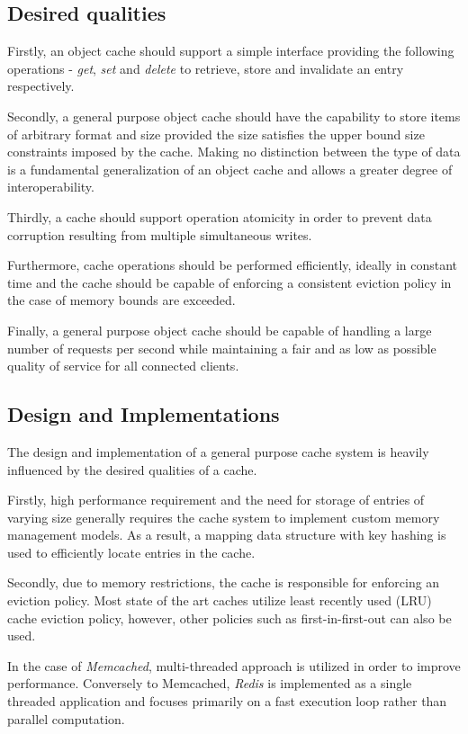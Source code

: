 \subsection{Desired qualities}
Firstly, an object cache should support a simple interface providing the following operations - \textit{get}, \textit{set} and \textit{delete} to retrieve, store and invalidate an entry respectively.

Secondly, a general purpose object cache should have the capability to store items of arbitrary format and size provided the size satisfies the upper bound size constraints imposed by the cache. Making no distinction between the type of data is a fundamental generalization of an object cache and allows a greater degree of interoperability.

Thirdly, a cache should support operation atomicity in order to prevent data corruption resulting from multiple simultaneous writes.

Furthermore, cache operations should be performed efficiently, ideally in constant time and the cache should be capable of enforcing a consistent eviction policy in the case of memory bounds are exceeded.

Finally, a general purpose object cache should be capable of handling a large number of requests per second while maintaining a fair and as low as possible quality of service for all connected clients.


\subsection{Design and Implementations}
The design and implementation of a general purpose cache system is heavily influenced by the desired qualities of a cache.

Firstly, high performance requirement and the need for storage of entries of varying size generally requires the cache system to implement custom memory management models. As a result, a mapping data structure  with key hashing is used to efficiently locate entries in the cache.

Secondly, due to memory restrictions, the cache is responsible for enforcing an eviction policy. Most state of the art caches utilize least recently used (LRU) cache eviction policy, however, other policies such as first-in-first-out can also be used.

In the case of \textit{Memcached}, multi-threaded approach is utilized in order to improve performance. Conversely to Memcached, \textit{Redis} is implemented as a single threaded application and focuses primarily on a fast execution loop rather than parallel computation.


